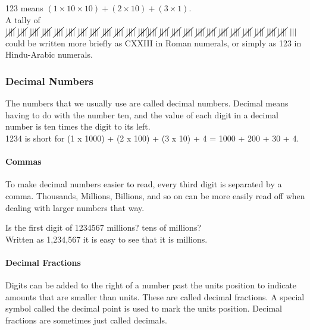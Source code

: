 \documentclass{article}
\begin{document}
123 means $(1 \times 10 \times 10) + (2 \times 10) + (3 \times 1)$.\\

A tally of $\cancel{||||}\ \cancel{||||}\ \cancel{||||}\ \cancel{||||}\ \cancel{||||}\ \cancel{||||}\ \cancel{||||}\ \cancel{||||}\ \cancel{||||}\ \cancel{||||}\ \cancel{||||}\ \cancel{||||}\ \\
\cancel{||||}\ \cancel{||||}\ \cancel{||||}\ \cancel{||||}\ \cancel{||||}\: \cancel{||||}\ \cancel{||||}\ \cancel{||||}\ \cancel{||||}\ \cancel{||||}\ \cancel{||||}\: \cancel{||||}\ |||$ could be written more briefly as CXXIII in Roman numerals, or simply as 123 in Hindu-Arabic numerals.

\newpage

\subsubsection*{Decimal Numbers}
The numbers that we usually use are called decimal numbers. Decimal means having to do with the number ten, and the value of each digit in a decimal number is ten times the digit to its left.\\

1234 is short for (1 x 1000) + (2 x 100) + (3 x 10) + 4 = 1000 + 200 + 30 + 4.\\

\paragraph{Commas}
To make decimal numbers easier to read, every third digit is separated by a comma. Thousands, Millions, Billions, and so on can be more easily read off when dealing with larger numbers that way.

Is the first digit of 1234567 millions? tens of millions?\\

Written as 1,234,567 it is easy to see that it is millions.\\

\paragraph{Decimal Fractions}
Digits can be added to the right of a number past the units position to indicate amounts that are smaller than units. These are called decimal fractions. A special symbol called the decimal point is used to mark the units position. Decimal fractions are sometimes just called decimals.\\
\end{document}
